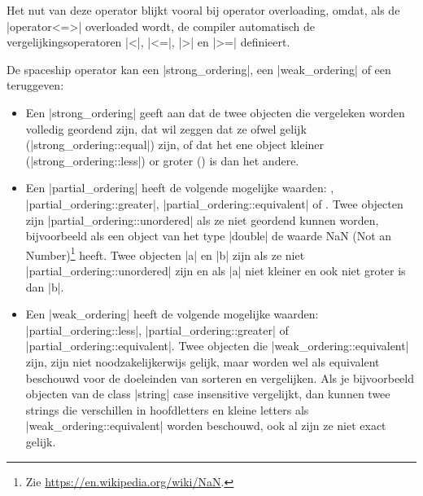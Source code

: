 \begin{cpplstShortInline}
Het nut van deze operator blijkt vooral bij operator overloading, omdat, als de |operator<=>| overloaded wordt, de compiler automatisch de vergelijkingsoperatoren |<|, |<=|, |>| en |>=| definieert.

De spaceship operator kan een |strong_ordering|, een |weak_ordering| of een  teruggeven:
\begin{itemize}
	\item
	Een |strong_ordering| geeft aan dat de twee objecten die vergeleken worden volledig geordend zijn, dat wil zeggen dat ze ofwel gelijk (|strong_ordering::equal|) zijn, of dat het ene object kleiner (|strong_ordering::less|) or groter () is dan het andere.
	\item
	Een |partial_ordering| heeft de volgende mogelijke waarden: , |partial_ordering::greater|, |partial_ordering::equivalent| of .
	Twee objecten zijn |partial_ordering::unordered| als ze niet geordend kunnen worden, bijvoorbeeld als een object van het type |double| de waarde NaN (Not an Number)\footnote{%
		Zie \url{https://en.wikipedia.org/wiki/NaN}.
	} heeft.
	Twee objecten |a| en |b| zijn  als ze niet |partial_ordering::unordered| zijn en als |a| niet kleiner en ook niet groter is dan |b|.
	\item
	Een |weak_ordering| heeft de volgende mogelijke waarden: |partial_ordering::less|, |partial_ordering::greater| of |partial_ordering::equivalent|.
	Twee objecten die |weak_ordering::equivalent| zijn, zijn niet noodzakelijkerwijs gelijk, maar worden wel als equivalent beschouwd voor de doeleinden van sorteren en vergelijken.
	Als je bijvoorbeeld objecten van de class |string| case insensitive vergelijkt, dan kunnen twee strings die verschillen in hoofdletters en kleine letters als |weak_ordering::equivalent| worden beschouwd, ook al zijn ze niet exact gelijk.
\end{itemize}


\end{cpplstShortInline}
